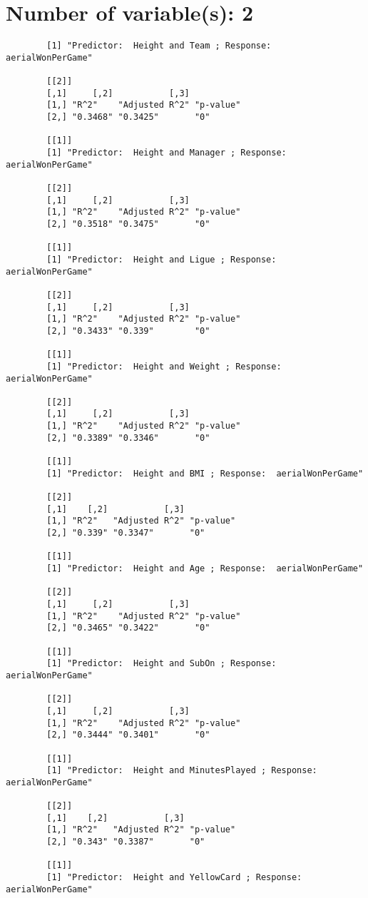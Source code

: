 \documentclass[12pt]{article}
\begin{document}
	\section{Number of variable(s): 2}
	\begin{verbatim}
		[1] "Predictor:  Height and Team ; Response:  aerialWonPerGame"
		
		[[2]]
		[,1]     [,2]           [,3]     
		[1,] "R^2"    "Adjusted R^2" "p-value"
		[2,] "0.3468" "0.3425"       "0"      
		
		[[1]]
		[1] "Predictor:  Height and Manager ; Response:  aerialWonPerGame"
		
		[[2]]
		[,1]     [,2]           [,3]     
		[1,] "R^2"    "Adjusted R^2" "p-value"
		[2,] "0.3518" "0.3475"       "0"      
		
		[[1]]
		[1] "Predictor:  Height and Ligue ; Response:  aerialWonPerGame"
		
		[[2]]
		[,1]     [,2]           [,3]     
		[1,] "R^2"    "Adjusted R^2" "p-value"
		[2,] "0.3433" "0.339"        "0"      
		
		[[1]]
		[1] "Predictor:  Height and Weight ; Response:  aerialWonPerGame"
		
		[[2]]
		[,1]     [,2]           [,3]     
		[1,] "R^2"    "Adjusted R^2" "p-value"
		[2,] "0.3389" "0.3346"       "0"      
		
		[[1]]
		[1] "Predictor:  Height and BMI ; Response:  aerialWonPerGame"
		
		[[2]]
		[,1]    [,2]           [,3]     
		[1,] "R^2"   "Adjusted R^2" "p-value"
		[2,] "0.339" "0.3347"       "0"      
		
		[[1]]
		[1] "Predictor:  Height and Age ; Response:  aerialWonPerGame"
		
		[[2]]
		[,1]     [,2]           [,3]     
		[1,] "R^2"    "Adjusted R^2" "p-value"
		[2,] "0.3465" "0.3422"       "0"      
		
		[[1]]
		[1] "Predictor:  Height and SubOn ; Response:  aerialWonPerGame"
		
		[[2]]
		[,1]     [,2]           [,3]     
		[1,] "R^2"    "Adjusted R^2" "p-value"
		[2,] "0.3444" "0.3401"       "0"      
		
		[[1]]
		[1] "Predictor:  Height and MinutesPlayed ; Response:  aerialWonPerGame"
		
		[[2]]
		[,1]    [,2]           [,3]     
		[1,] "R^2"   "Adjusted R^2" "p-value"
		[2,] "0.343" "0.3387"       "0"      
		
		[[1]]
		[1] "Predictor:  Height and YellowCard ; Response:  aerialWonPerGame"
		

\end{verbatim}
\end{document}
